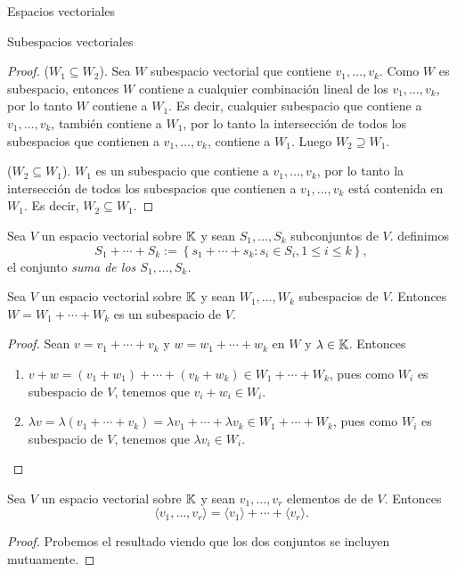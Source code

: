 \begin{chapter}{Espacios vectoriales}
\begin{section}{Subespacios vectoriales}
\begin{proof}
        ($W_1 \subseteq W_2$). Sea $W$  subespacio vectorial que contiene $v_1,\ldots,v_k$. Como $W$ es subespacio,  entonces  $W$ contiene a cualquier combinación lineal de los $v_1,\ldots,v_k$, por lo tanto $W$ contiene a $W_1$. Es decir, cualquier subespacio que contiene a $v_1,\ldots,v_k$,  también contiene a  $W_1$, por lo tanto la intersección de todos los subespacios que  contienen a $v_1,\ldots,v_k$, contiene a $W_1$. Luego $W_2 \supseteq W_1$.
        
        ($W_2 \subseteq W_1$). $W_1$ es un subespacio que contiene a $v_1,\ldots,v_k$, por lo tanto  la intersección de todos los subespacios que  contienen a $v_1,\ldots,v_k$  está contenida en $W_1$. Es decir, $W_2 \subseteq W_1$.
    \end{proof}
        
        
    \begin{definicion} Sea $V$ un espacio vectorial sobre $\mathbb K$ y sean $S_1,\ldots,S_k$ subconjuntos  de $V$.
        definimos 
        \begin{equation*}
            S_1+  \cdots +S_k := \left\{s_1+\cdots+s_k: s_i \in S_i, 1 \le i \le k \right\},
        \end{equation*}
        el conjunto \textit{suma de los  $S_1,\ldots,S_k$.}
    \end{definicion}	

    \begin{teorema}
         Sea $V$ un espacio vectorial sobre $\mathbb K$ y sean $W_1,\ldots,W_k$ subespacios  de $V$. Entonces $W= W_1+\cdots+W_k$ es un subespacio de $V$.
    \end{teorema}
    \begin{proof}
        Sean $v = v_1+\cdots+v_k$ y $w = w_1+\cdots+w_k$ en $W$ y $\lambda \in \mathbb K$. Entonces
        \begin{enumerate}[label=\textit{\alph*)},ref=\textit{\alph*)}]
            \item $v+w =  (v_1+w_1)+\cdots+(v_k+w_k) \in W_1+\cdots+W_k$, pues como $W_i$ es subespacio de $V$, tenemos que $v_i+w_i \in W_i$.
            \item  $\lambda v = \lambda(v_1+\cdots+v_k) = \lambda v_1+\cdots+\lambda v_k \in W_1+\cdots+W_k$, pues como $W_i$ es subespacio de $V$, tenemos que $\lambda v_i \in W_i$.
        \end{enumerate}
    \end{proof}

    \begin{proposicion}
        Sea $V$ un espacio vectorial sobre $\mathbb K$ y sean $v_1,\ldots,v_r$ elementos de   de $V$. Entonces
        \begin{equation*}
            \langle v_1,\ldots,v_r \rangle = \langle v_1 \rangle+ \cdots + \langle v_r \rangle.
        \end{equation*}
    \end{proposicion}
    \begin{proof}
        Probemos el resultado viendo que los dos conjuntos se incluyen mutuamente.
        

\end{proof}
\end{section}
\end{chapter}
